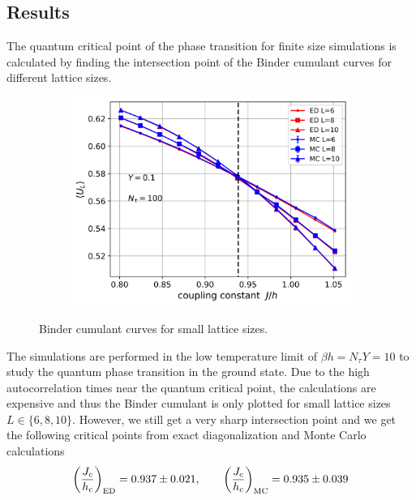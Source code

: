 \documentclass[../thesis_main.tex]{subfiles}
\begin{document}
\subsection{Results}
The quantum critical point of the phase transition for finite size simulations is calculated by finding the intersection point of the Binder cumulant curves for different lattice sizes.
\begin{figure}[!htb]
    \centering
    \begin{subfigure}[b]{0.6\textwidth}  %
        \centering
        \includegraphics[width=\textwidth]{images/quantum_criticality/Binder_cumulant_dashed.png}
    \end{subfigure}
    \caption{Binder cumulant curves for small lattice sizes.}
    \label{quantumbinder}
\end{figure}
\FloatBarrier
The simulations are performed in the low temperature limit of $\beta h = N_\tau Y = 10$ to study the quantum phase transition in the ground state. Due to the high autocorrelation times near the quantum critical point, the calculations are expensive and thus the Binder cumulant is only plotted for small lattice sizes $L \in \{6, 8, 10\}$. However, we still get a very sharp intersection point and we get the following critical points from exact diagonalization and Monte Carlo calculations
\begin{equation}
    \qty(\frac{J_c}{h_c})_\text{ED} = 0.937 \pm 0.021, \qquad \qty(\frac{J_c}{h_c})_\text{MC} = 0.935 \pm 0.039 
\end{equation}
\end{document}
